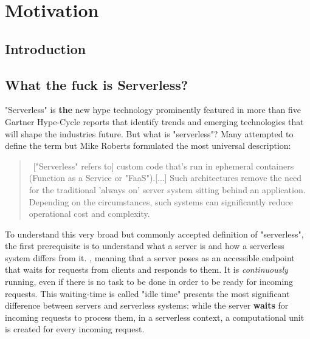 \chapter{Motivation}


\section{Introduction}



\section{What the fuck is Serverless?}

"Serverless" is \textbf{the} new hype technology prominently featured in more than five Gartner Hype-Cycle reports that identify trends and emerging technologies that will shape the industries future. 
\autocite{Smith2017Hype2017}
\autocite{Weiss2017Hype2017}
\autocite{Natis2017Hype2017}
\autocite{Walker2017Hype2017}
\autocite{DawsonPhilip2017Hype2017}
But what is "serverless"? Many attempted to define the term but Mike Roberts formulated the most universal description:  

\blockquote{\guillemotleft \ ["Serverless" refers to] custom code that's run in ephemeral containers (Function as a Service or "FaaS").[...] Such architectures remove the need for the traditional 'always on' server system sitting behind an application. Depending on the circumstances, such systems can significantly reduce operational cost and complexity. \guillemotright\autocite{Roberts2016ServerlessArchitectures}}

To understand this very broad but commonly accepted definition of "serverless", the first prerequisite is to understand what a server is and how a serverless system differs from it. \autocite{TheServer}, meaning that a server poses as an accessible endpoint that waits for requests from clients and responds to them. It is \textit{continuously} running, even if there is no task to be done in order to be ready for incoming requests. This waiting-time is called "idle time" presents the most significant difference between servers and serverless systems: while the server \textbf{waits} for incoming requests to process them, in a serverless context, a computational unit is created for every incoming request.

